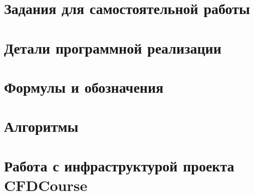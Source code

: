 \documentclass[a4paper,12pt]{article}
\numberwithin{equation}{section}
\begin{document}
\newpage
\tableofcontents
\newpage



%

%
%

%

%

\appendix
\section{Задания для самостоятельной работы}






\section{Детали программной реализации}


%
%

\section{Формулы и обозначения}




\section{Алгоритмы}




\section{Работа с инфраструктурой проекта CFDCourse}





\end{document}
